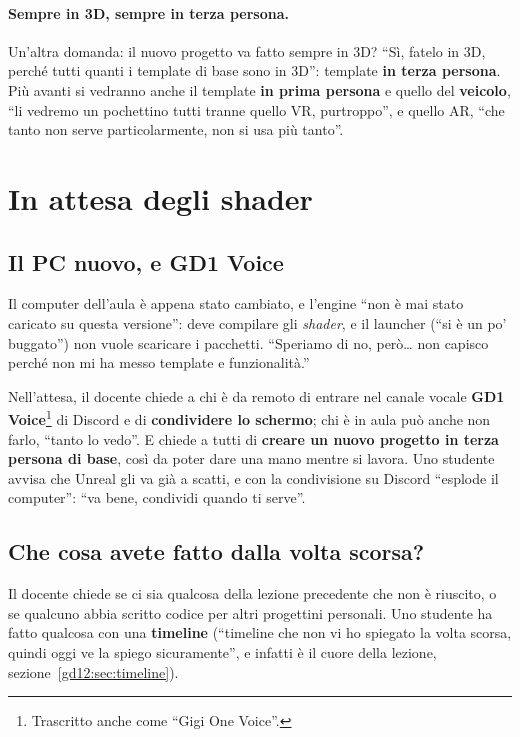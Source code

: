 \paragraph{Sempre in 3D, sempre in terza persona.} Un'altra domanda: il nuovo
progetto va fatto sempre in 3D? ``Sì, fatelo in 3D, perché tutti quanti i
template di base sono in 3D'': template \textbf{in terza persona}. Più avanti
si vedranno anche il template \textbf{in prima persona} e quello del
\textbf{veicolo}, ``li vedremo un pochettino tutti tranne quello VR, purtroppo'',
e quello AR, ``che tanto non serve particolarmente, non si usa più tanto''.

\section{In attesa degli shader}
\label{gd12:sec:attesa}

\subsection{Il PC nuovo, e GD1 Voice}

Il computer dell'aula è appena stato cambiato, e l'engine ``non è mai stato
caricato su questa versione'': deve compilare gli \emph{shader}, e il launcher
(``si è un po' buggato'') non vuole scaricare i pacchetti. ``Speriamo di no,
però\dots{} non capisco perché non mi ha messo template e funzionalità.''

Nell'attesa, il docente chiede a chi è da remoto di entrare nel canale vocale
\textbf{GD1 Voice}\footnote{Trascritto anche come ``Gigi One Voice''.} di
Discord e di \textbf{condividere lo schermo}; chi è in aula può anche non farlo,
``tanto lo vedo''. E chiede a tutti di \textbf{creare un nuovo progetto in
terza persona di base}, così da poter dare una mano mentre si lavora. Uno
studente avvisa che Unreal gli va già a scatti, e con la condivisione su
Discord ``esplode il computer'': ``va bene, condividi quando ti serve''.

\subsection{Che cosa avete fatto dalla volta scorsa?}

Il docente chiede se ci sia qualcosa della lezione precedente che non è
riuscito, o se qualcuno abbia scritto codice per altri progettini personali. Uno
studente ha fatto qualcosa con una \textbf{timeline} (``timeline che non vi ho
spiegato la volta scorsa, quindi oggi ve la spiego sicuramente'', e infatti è
il cuore della lezione, sezione~\ref{gd12:sec:timeline}).

